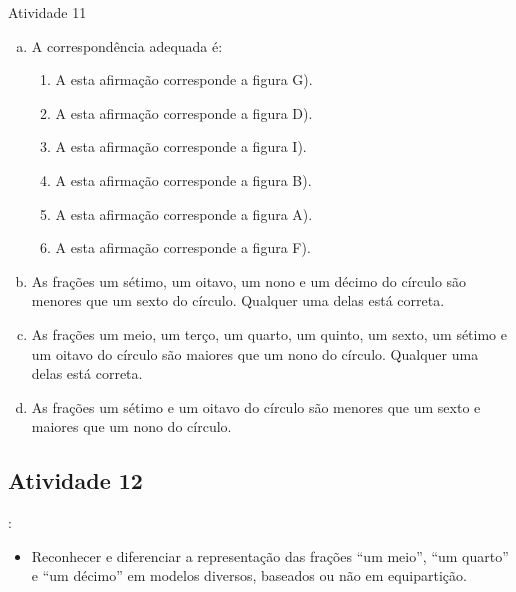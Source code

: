 \begin{resposta*}{Atividade 11}
\begin{enumerate}[a),wide,labelindent=0pt] %
    \item       A correspondência adequada é:
\begin{enumerate} [\;\; I), labelindent=0pt] %
        \item           A esta afirmação corresponde a figura G).
        \item           A esta afirmação corresponde a figura D).
        \item           A esta afirmação corresponde a figura I).
        \item           A esta afirmação corresponde a figura B).
        \item           A esta afirmação corresponde a figura A).
        \item           A esta afirmação corresponde a figura F).
\end{enumerate} %

    \item       As frações um sétimo, um oitavo, um nono e um décimo do círculo são menores que um sexto do círculo. Qualquer uma delas está correta.
    \item       As frações um meio, um terço, um quarto, um quinto, um sexto, um sétimo e um oitavo do círculo são maiores que um nono do círculo. Qualquer uma delas está correta.
    \item       As frações um sétimo e um oitavo do círculo são menores que um sexto e maiores que um nono do círculo.
\end{enumerate} %
\end{resposta*}

\newpage

\subsection{Atividade 12}

  : \vspace{.1cm}

\begin{itemize} %
    \item Reconhecer e diferenciar a representação das frações ``um meio'', ``um quarto'' e       ``um décimo'' em modelos diversos, baseados  ou não em equipartição.
\end{itemize} %

 \vspace{.1cm}


